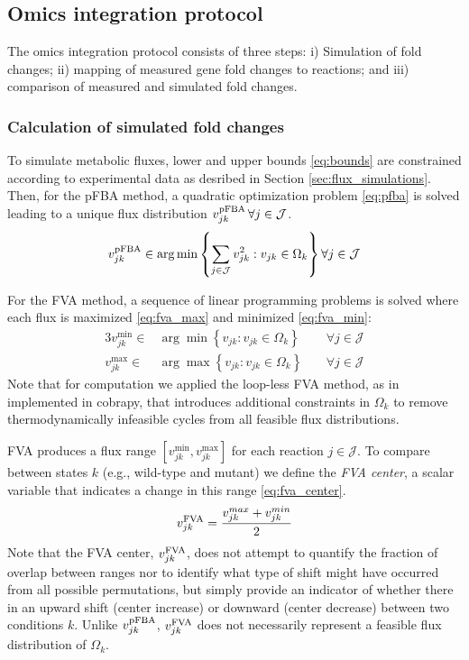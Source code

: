 \subsection{Omics integration protocol}\label{sec:proteomics_method}
The omics integration protocol consists of three steps: i) Simulation of fold changes; ii) mapping of measured gene fold changes to reactions; and iii) comparison of measured and simulated fold changes.

\subsubsection{Calculation of simulated fold changes}
To simulate metabolic fluxes, lower and upper bounds \eqref{eq:bounds} are constrained according to experimental data as desribed in Section \ref{sec:flux_simulations}. Then, for the pFBA method, a quadratic optimization problem \eqref{eq:pfba} is solved leading to a unique flux distribution $v_{jk}^{\mathrm{pFBA}}\, \forall j \in \mathcal{J}$.
\begin{equation}
    v_{jk}^{\mathrm{pFBA}} \in \arg \min \left\{ \sum_{j \in \mathcal{J}} v_{jk}^2: v_{jk} \in \Omega_k \right\} \forall j \in \mathcal{J} \label{eq:pfba}
\end{equation}

For the FVA method, a sequence of linear programming problems is solved where each flux is maximized \eqref{eq:fva_max} and minimized \eqref{eq:fva_min}:
\begin{alignat}{3}
    v_{jk}^{\min} \in & \arg \min \left\{ v_{jk}: v_{jk} \in \Omega_k \right\} && \; \forall j \in \mathcal{J} \label{eq:fva_min}\\
    v_{jk}^{\max} \in & \arg \max \left\{ v_{jk}: v_{jk} \in \Omega_k \right\} && \; \forall j \in \mathcal{J} \label{eq:fva_max}
\end{alignat}
Note that for computation we applied the loop-less FVA method,\citep{schellenberger2011a, chan2018} as in implemented in \mbox{cobrapy},\citep{ebrahim2013}  that introduces additional constraints in $\Omega_k$ to remove thermodynamically infeasible cycles from all feasible flux distributions.

FVA produces a flux range $[v_{jk}^{\min}, v_{jk}^{\max}]$  for each reaction $j \in \mathcal{J}$. To compare between states $k$ (e.g., wild-type and mutant) we define the \emph{FVA center}, a scalar variable that indicates a change in this range \eqref{eq:fva_center}.
\begin{equation}
    v_{jk}^{\mathrm{FVA}} = \frac{v_{jk}^{max} + v_{jk}^{min}}{2} \label{eq:fva_center}
\end{equation}
Note that the FVA center, $v_{jk}^{\mathrm{FVA}}$, does not attempt to quantify the fraction of overlap between ranges nor to identify what type of shift might have occurred from all possible permutations, but simply provide an indicator of whether there in an upward shift (center increase) or downward (center decrease) between two conditions $k$.
Unlike $v_{jk}^{\mathrm{pFBA}}$, $v_{jk}^{\mathrm{FVA}}$ does not necessarily represent a feasible flux distribution of $\Omega_k$.


